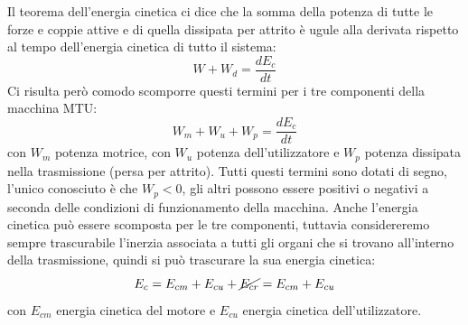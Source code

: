 \newline
Il teorema dell'energia cinetica ci dice che la somma della potenza di tutte le forze e coppie attive e di quella dissipata per attrito è ugule alla derivata rispetto al tempo dell'energia cinetica di tutto il sistema:
\[
    W + W_d = \frac{dE_c}{dt}
\]
Ci risulta però comodo scomporre questi termini per i tre componenti della macchina MTU:
\[
    W_m + W_u + W_p = \frac{dE_c}{dt}
\]
con $W_m$ potenza motrice, con $W_u$ potenza dell'utilizzatore e $W_p$ potenza dissipata nella trasmissione (persa per attrito).\newline
\newline
Tutti questi termini sono dotati di segno, l'unico conosciuto è che $W_p <0$, gli altri possono essere positivi o negativi a seconda delle condizioni di funzionamento della macchina.\newline
\newline
Anche l'energia cinetica può essere scomposta per le tre componenti, tuttavia considereremo sempre trascurabile l'inerzia associata a tutti gli organi che si trovano all'interno della trasmissione, quindi si può trascurare la sua energia cinetica:
\[
    E_c = E_{cm} + E_{cu} + \cancel{E_{cr}} = E_{cm} + E_{cu}
\]
con $E_{cm}$ energia cinetica del motore e $E_{cu}$ energia  cinetica dell'utilizzatore.\newline
\newline
